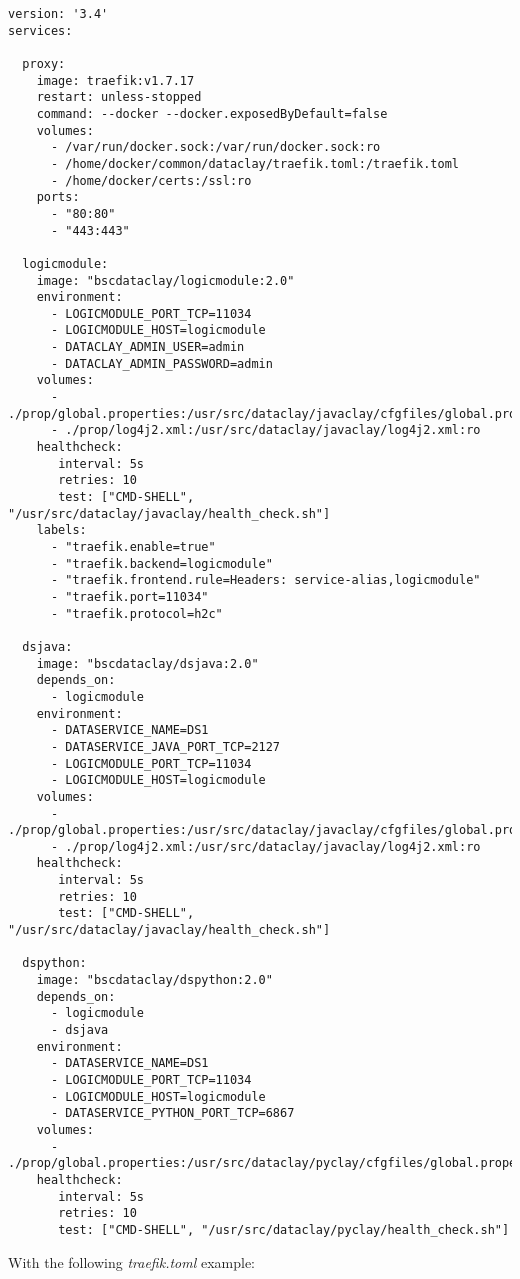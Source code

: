 \begin{tBox}
 \begin{lstlisting}[language=docker-compose-2, frame=none]
version: '3.4'
services:

  proxy:
    image: traefik:v1.7.17
    restart: unless-stopped
    command: --docker --docker.exposedByDefault=false
    volumes:
      - /var/run/docker.sock:/var/run/docker.sock:ro
      - /home/docker/common/dataclay/traefik.toml:/traefik.toml
      - /home/docker/certs:/ssl:ro
    ports:
      - "80:80"
      - "443:443"
      
  logicmodule:
    image: "bscdataclay/logicmodule:2.0"
    environment:
      - LOGICMODULE_PORT_TCP=11034
      - LOGICMODULE_HOST=logicmodule
      - DATACLAY_ADMIN_USER=admin
      - DATACLAY_ADMIN_PASSWORD=admin
    volumes:
      - ./prop/global.properties:/usr/src/dataclay/javaclay/cfgfiles/global.properties:ro
      - ./prop/log4j2.xml:/usr/src/dataclay/javaclay/log4j2.xml:ro
    healthcheck:
       interval: 5s
       retries: 10
       test: ["CMD-SHELL", "/usr/src/dataclay/javaclay/health_check.sh"]
    labels:
      - "traefik.enable=true"
      - "traefik.backend=logicmodule"
      - "traefik.frontend.rule=Headers: service-alias,logicmodule"
      - "traefik.port=11034"
      - "traefik.protocol=h2c"
          
  dsjava:
    image: "bscdataclay/dsjava:2.0"
    depends_on:
      - logicmodule
    environment:
      - DATASERVICE_NAME=DS1
      - DATASERVICE_JAVA_PORT_TCP=2127
      - LOGICMODULE_PORT_TCP=11034
      - LOGICMODULE_HOST=logicmodule
    volumes:
      - ./prop/global.properties:/usr/src/dataclay/javaclay/cfgfiles/global.properties:ro
      - ./prop/log4j2.xml:/usr/src/dataclay/javaclay/log4j2.xml:ro
    healthcheck:
       interval: 5s
       retries: 10
       test: ["CMD-SHELL", "/usr/src/dataclay/javaclay/health_check.sh"]
       
  dspython:
    image: "bscdataclay/dspython:2.0"
    depends_on:
      - logicmodule
      - dsjava
    environment:
      - DATASERVICE_NAME=DS1
      - LOGICMODULE_PORT_TCP=11034
      - LOGICMODULE_HOST=logicmodule
      - DATASERVICE_PYTHON_PORT_TCP=6867
    volumes:
      - ./prop/global.properties:/usr/src/dataclay/pyclay/cfgfiles/global.properties:ro
    healthcheck:
       interval: 5s
       retries: 10
       test: ["CMD-SHELL", "/usr/src/dataclay/pyclay/health_check.sh"]
 \end{lstlisting}
\end{tBox}

With the following \textit{traefik.toml} example:

